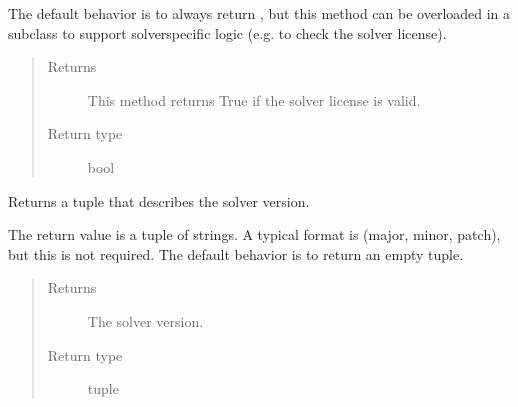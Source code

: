 \documentclass[letterpaper,10pt,english]{sphinxmanual}
\begin{document}
\begin{fulllineitems}
\begin{fulllineitems}
The default behavior is to always return , but this method
can be overloaded in a subclass to support solver\sphinxhyphen{}specific logic
(e.g.  to check the solver license).
\begin{quote}\begin{description}
\item[{Returns}] \leavevmode
This method returns True if the solver license is valid.

\item[{Return type}] \leavevmode
bool

\end{description}\end{quote}

\end{fulllineitems}


\begin{fulllineitems}
\label{\detokenize{reference/mpr:pao.mpr.solvers.pccg.LinearMultilevelSolver_PCCG.version}}
Returns a tuple that describes the solver version.

The return value is a tuple of strings.  A typical format is (major, minor, patch), but this
is not required. The default behavior is to return an empty tuple.
\begin{quote}\begin{description}
\item[{Returns}] \leavevmode
The solver version.

\item[{Return type}] \leavevmode
tuple

\end{description}\end{quote}

\end{fulllineitems}


\end{fulllineitems}

\end{document}
